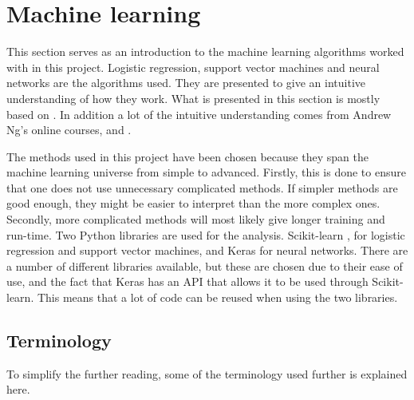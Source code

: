 \section{Machine learning}
    
    This section serves as an introduction to the machine learning algorithms worked with in this project. Logistic regression, support vector machines and neural networks are the algorithms used. They are presented to give an intuitive understanding of how they work. What is presented in this section is mostly based on \cite{Hastie}. In addition a lot of the intuitive understanding comes from Andrew Ng's online courses, \cite{machinlearning} and \cite{deepLearning}.
    
    The methods used in this project have been chosen because they span the machine learning universe from simple to advanced. Firstly, this is done to ensure that one does not use unnecessary complicated methods. If simpler methods are good enough, they might be easier to interpret than the more complex ones. Secondly, more complicated methods will most likely give longer training and run-time. Two Python libraries are used for the analysis. Scikit-learn \cite{scikit-learn}, \cite{scikit-web} for logistic regression and support vector machines, and Keras \cite{chollet2015keras} for neural networks. There are a number of different libraries available, but these are chosen due to their ease of use, and the fact that Keras has an API that allows it to be used through Scikit-learn. This means that a lot of code can be reused when using the two libraries. 
        
    
    \subsection{Terminology}
        To simplify the further reading, some of the terminology used further is explained here. 
        
